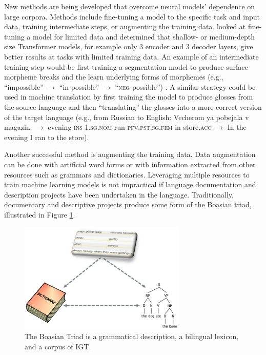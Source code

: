 New methods are being developed that overcome neural models' dependence on large corpora. Methods include fine-tuning a model to the specific task and input data, training intermediate steps, or augmenting the training data.
\citet{van_biljon_optimal_2020} looked at fine-tuning a model for limited data and determined that shallow- or medium-depth size Transformer models, for example only 3 encoder and 3 decoder layers, give better results at tasks with limited training data. An example of an intermediate training step would be first training a segmentation model to produce surface morpheme breaks and the learn underlying forms of morphemes (e.g., ``impossible'' $\rightarrow$ ``in-possible'' $\rightarrow$ ``\textsc{neg}-possible'') \citep{cotterell_joint_2016,liu_morphological_2018,moeller_improving_2019}. A similar strategy could be used in machine translation by first training the model to produce glosses from the source language and then ``translating'' the glosses into a more correct version of the target language (e.g., from Russian to English: Vecherom ya pobejala v magazin. $\rightarrow$ evening-\textsc{ins} \textsc{1.sg.nom} run-\textsc{pfv.pst.sg.fem} in store.\textsc{acc} $\rightarrow$ In the evening I ran to the store).

Another successful method is augmenting the training data. 
Data augmentation can be done with artificial word forms \citep{liu_morphological_2018} or with information extracted from other resources such as grammars and dictionaries. Leveraging multiple resources to train machine learning models is not impractical if language documentation and description projects have been undertaken in the language. Traditionally, documentary and descriptive projects produce some form of the Boasian triad, illustrated in Figure \ref{fig:Triad}. 

\begin{figure}[!tb]
\begin{center}
\includegraphics[width=8cm]{figs/Triad.PNG}
\caption[The Boasian Triad]{The Boasian Triad is a grammatical description, a bilingual lexicon, and a corpus of IGT.}
\label{fig:Triad}
\end{center}
\end{figure}


